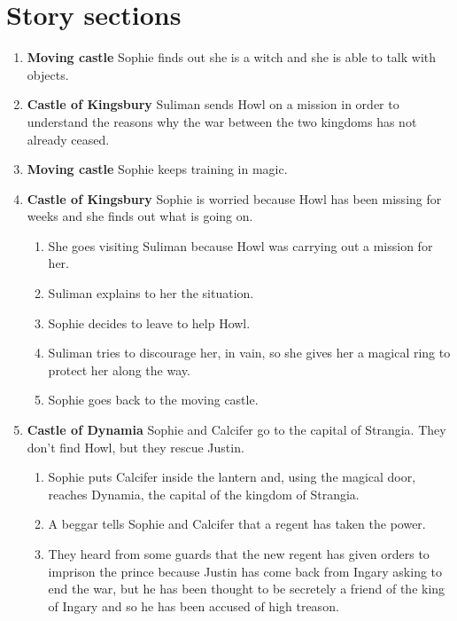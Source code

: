 \section{Story sections}

\begin{enumerate}
\item \textbf{Moving castle} Sophie finds out she is a witch and she is able to talk with objects.
  
\item \textbf{Castle of Kingsbury} Suliman sends Howl on a mission in order to understand the reasons why the war between the two kingdoms has not already ceased.
  
\item \textbf{Moving castle} Sophie keeps training in magic.
  
\item \textbf{Castle of Kingsbury} Sophie is worried because Howl has been missing for weeks and she finds out what is going on.
  \begin{enumerate}
  \item She goes visiting Suliman because Howl was carrying out a mission for her.
    
  \item Suliman explains to her the situation.

  \item Sophie decides to leave to help Howl.

  \item Suliman tries to discourage her, in vain, so she gives her a magical ring to protect her along the way.

  \item Sophie goes back to the moving castle.
  \end{enumerate}

\item \textbf{Castle of Dynamia} Sophie and Calcifer go to the capital of Strangia. They don’t find Howl, but they rescue Justin.

  \begin{enumerate}
  \item Sophie puts Calcifer inside the lantern and, using the magical door, reaches Dynamia, the capital of the kingdom of Strangia.
    
  \item A beggar tells Sophie and Calcifer that a regent has taken the power.
    
  \item They heard from some guards that the new regent has given orders to imprison the prince because Justin has come back from Ingary asking to end the war, but he has been thought to be secretely a friend of the king of Ingary and so he has been accused of high treason.
    

\end{enumerate}
\end{enumerate}
